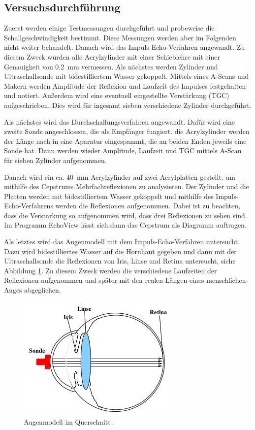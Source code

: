 \subsection{Versuchsdurchführung}
Zuerst werden einige Testmessungen durchgeführt und probeweise die Schallgeschwindigkeit
bestimmt. Diese Messungen werden aber im Folgenden nicht weiter behandelt. Danach wird
das Impuls-Echo-Verfahren angewandt. Zu diesem Zweck wurden alle Acrylzylinder mit einer
Schieblehre mit einer Genauigkeit von \SI{0.2}{\milli\meter} vermessen. Als nächstes
werden Zylinder und Ultraschallsonde mit bidestilliertem Wasser gekoppelt.
Mittels eines A-Scans und Makern werden Amplitude der Reflexion und Laufzeit des Impulses
festgehalten und notiert. Außerdem wird eine eventuell eingestellte Verstärkung (TGC) aufgeschrieben.
Dies wird für ingesamt sieben verschiedene Zylinder durchgeführt.

Als nächstes wird das Durchschallungsverfahren angewandt. Dafür wird eine zweite Sonde
angeschlossen, die als Empfänger fungiert. die Acrylzylinder werden der Länge nach in
eine Aparatur eingespannnt, die an beiden Enden jeweils eine Sonde hat. Dann werden wieder
Amplitude, Laufzeit und TGC mittels A-Scan für sieben Zylinder aufgenommen.

Danach wird ein ca. \SI{40}{\milli\meter} Acrylzylinder auf zwei Acrylplatten gestellt,
um mithilfe des Cepstrums Mehrfachreflexionen zu analysieren. Der Zylinder und die Platten
werden mit bidestilliertem Wasser gekoppelt und mithilfe des Impuls-Echo-Verfahrens werden die
Reflexionen aufgenommen. Dabei ist zu beachten, dass die Verstärkung so aufgenommen wird,
dass drei Reflexionen zu sehen sind. Im Programm EchoView lässt sich dann das Cepstrum
als Diagramm auftragen.

Als letztes wird das Augenmodell mit dem Impuls-Echo-Verfahren untersucht. Dazu wird
bidestilliertes Wasser auf die Hornhaut gegeben und dann mit der Ultraschallsonde
die Reflexionen von Iris, Linse und Retina untersucht, siehe Abbildung \ref{fig:3}.
Zu diesem Zweck werden die verschiedene Laufzeiten der Reflexionen aufgenommen und
später mit den realen Längen eines menschlichen Auges abgeglichen.
\begin{figure}
  \centering
  \includegraphics[scale=0.5]{auge.png}
  \caption{Augenmodell im Querschnitt \cite{anleitung}.}
  \label{fig:3}
\end{figure}
